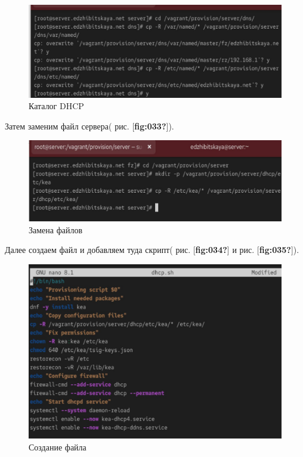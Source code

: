 \documentclass[
  english,
  russian,
  12pt,
  a4paper,
  DIV=11,
  numbers=noendperiod]{scrreprt}
\begin{document}
\begin{figure}

{\centering \includegraphics[width=0.7\linewidth,height=\textheight,keepaspectratio]{image/32.jpg}

}

\caption{Каталог DHCP}

\end{figure}%

Затем заменим файл сервера( рис. {[}\textbf{fig:033?}{]}).

\begin{figure}

{\centering \includegraphics[width=0.7\linewidth,height=\textheight,keepaspectratio]{image/33.jpg}

}

\caption{Замена файлов}

\end{figure}%

Далее создаем файл и добавляем туда скрипт( рис. {[}\textbf{fig:034?}{]}
и рис. {[}\textbf{fig:035?}{]}).

\begin{figure}

{\centering \includegraphics[width=0.7\linewidth,height=\textheight,keepaspectratio]{image/34.jpg}

}

\caption{Создание файла}

\end{figure}%
\end{document}
